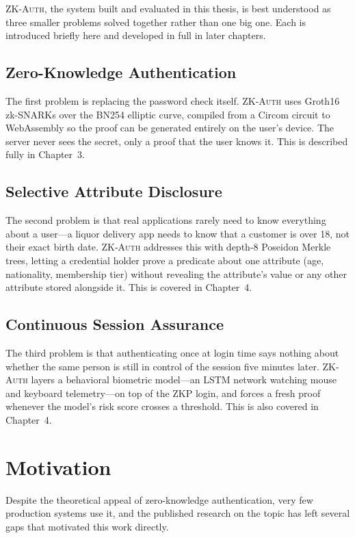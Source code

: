 \documentclass[12pt,a4paper,oneside]{report}
\begin{document}
\textsc{ZK-Auth}, the system built and evaluated in this thesis, is best
understood as three smaller problems solved together rather than one big
one. Each is introduced briefly here and developed in full in later
chapters.

\subsection{Zero-Knowledge Authentication}

The first problem is replacing the password check itself. \textsc{ZK-Auth}
uses Groth16 zk-SNARKs over the BN254 elliptic curve, compiled from a
Circom circuit to WebAssembly so the proof can be generated entirely on
the user's device. The server never sees the secret, only a proof that
the user knows it. This is described fully in Chapter~3.

\subsection{Selective Attribute Disclosure}

The second problem is that real applications rarely need to know
everything about a user---a liquor delivery app needs to know that a
customer is over 18, not their exact birth date. \textsc{ZK-Auth}
addresses this with depth-8 Poseidon Merkle trees, letting a credential
holder prove a predicate about one attribute (age, nationality,
membership tier) without revealing the attribute's value or any other
attribute stored alongside it. This is covered in Chapter~4.

\subsection{Continuous Session Assurance}

The third problem is that authenticating once at login time says nothing
about whether the same person is still in control of the session five
minutes later. \textsc{ZK-Auth} layers a behavioral biometric model---an
LSTM network watching mouse and keyboard telemetry---on top of the ZKP
login, and forces a fresh proof whenever the model's risk score crosses a
threshold. This is also covered in Chapter~4.

\section{Motivation}

Despite the theoretical appeal of zero-knowledge authentication, very few
production systems use it, and the published research on the topic has
left several gaps that motivated this work directly.
\end{document}
